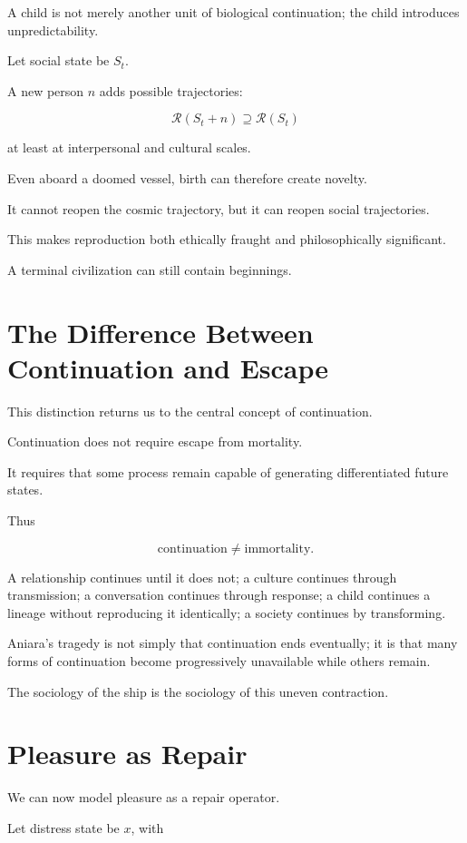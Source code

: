 \documentclass[11pt,oneside]{book}
\theoremstyle{definition}
\theoremstyle{remark}
\newcommand{\R}{\mathcal{R}}
\begin{document}
A child is not merely another unit of biological continuation; the child introduces unpredictability.

Let social state be \(S_t\).

A new person \(n\) adds possible trajectories:

\[
\R(S_t+n)
\supseteq
\R(S_t)
\]

at least at interpersonal and cultural scales.

Even aboard a doomed vessel, birth can therefore create novelty.

It cannot reopen the cosmic trajectory, but it can reopen social trajectories.

This makes reproduction both ethically fraught and philosophically significant.

A terminal civilization can still contain beginnings.

\section{The Difference Between Continuation and Escape}

This distinction returns us to the central concept of continuation.

Continuation does not require escape from mortality.

It requires that some process remain capable of generating differentiated future states.

Thus

\[
\text{continuation}
\neq
\text{immortality}.
\]

A relationship continues until it does not; a culture continues through transmission; a conversation continues through response; a child continues a lineage without reproducing it identically; a society continues by transforming.

Aniara's tragedy is not simply that continuation ends eventually; it is that many forms of continuation become progressively unavailable while others remain.

The sociology of the ship is the sociology of this uneven contraction.

\section{Pleasure as Repair}

We can now model pleasure as a repair operator.

Let distress state be \(x\), with
\end{document}
